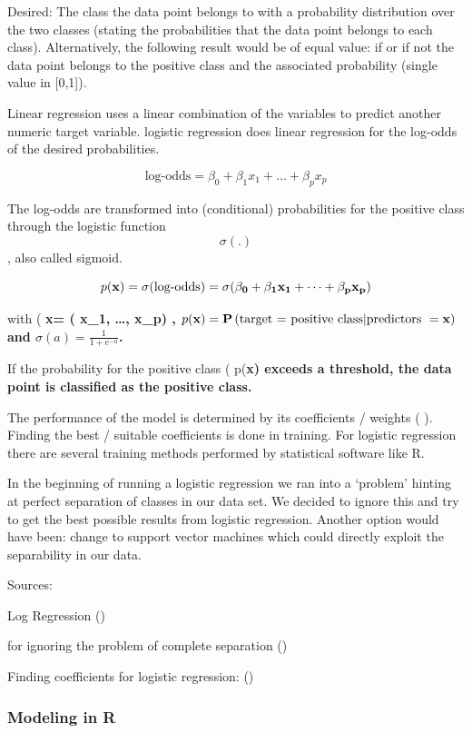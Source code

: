 \documentclass[]{article}
\begin{document}
Desired: The class the data point belongs to with a probability
distribution over the two classes (stating the probabilities that the
data point belongs to each class). Alternatively, the following result
would be of equal value: if or if not the data point belongs to the
positive class and the associated probability (single value in
{[}0,1{]}).

Linear regression uses a linear combination of the variables to predict
another numeric target variable. logistic regression does linear
regression for the log-odds of the desired probabilities.

\[
\text{log-odds} = \beta_0 + \beta_1 x_1 + \dots + \beta_p x_p     
\]

The log-odds are transformed into (conditional) probabilities for the
positive class through the logistic function \[\sigma(.)\], also called
sigmoid.

\[
p(\bf{x}) = \sigma(\text{log-odds}) = \sigma(\beta_0 + \beta_1 x_1 + \dots + \beta_p x_p ) 
\]

with (
\bf{x}= ( x_1, \dots, x_p) \) , \( p(\bf{x}) = \mathbf{P}\left(\text{target = positive class} | \text{predictors } = \bf{x} \right) \) and  \( \sigma(a) = \frac{1}{1+e^{-a}} \).

If the probability for the positive class (
p(\bf{x}) \)  exceeds a threshold, the data point is classified as the positive class.

The performance of the model is determined by its coefficients / weights
( \beta ). Finding the best / suitable coefficients is done in training.
For logistic regression there are several training methods performed by
statistical software like R.

In the beginning of running a logistic regression we ran into a
`problem' hinting at perfect separation of classes in our data set. We
decided to ignore this and try to get the best possible results from
logistic regression. Another option would have been: change to support
vector machines which could directly exploit the separability in our
data.

Sources:

Log Regression (\cite{logreg})

for ignoring the problem of complete separation (\cite{ucla})

Finding coefficients for logistic regression: (\cite{newton})

\subsubsection{Modeling in R}\label{modeling-in-r}
\end{document}
